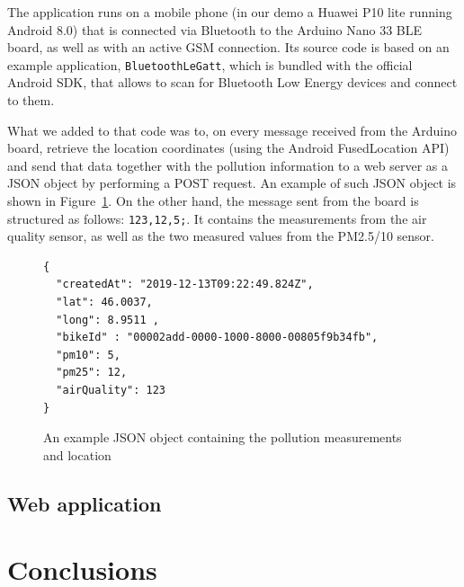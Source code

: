 \documentclass[12pt]{article}
\begin{document}
  The application runs on a mobile phone (in our demo a Huawei P10 lite running Android 8.0) that is connected via Bluetooth to the Arduino Nano 33 BLE board, as well as with an active GSM connection.
  Its source code is based on an example application, \verb|BluetoothLeGatt|, which is bundled with the official Android SDK, that allows to scan for Bluetooth Low Energy devices and connect to them. 

  What we added to that code was to, on every message received from the Arduino board, retrieve the location coordinates (using the Android FusedLocation API) and send that data together with the pollution information to a web server as a JSON object by performing a POST request. An example of such JSON object is shown in Figure~\ref{lst:json-packet}. On the other hand, the message sent from the board is structured as follows: \verb|123,12,5;|. It contains the measurements from the air quality sensor, as well as the two measured values from the PM2.5/10 sensor.


  \begin{figure}[h]
    \centering
    \begin{verbatim}
{
  "createdAt": "2019-12-13T09:22:49.824Z",
  "lat": 46.0037,
  "long": 8.9511 ,
  "bikeId" : "00002add-0000-1000-8000-00805f9b34fb",
  "pm10": 5,
  "pm25": 12,
  "airQuality": 123
}
    \end{verbatim}
  \caption{An example JSON object containing the pollution measurements and location}\label{lst:json-packet}
  \end{figure}

  \subsection{Web application}
  \newpage
  \section{Conclusions}
  
\end{document}
